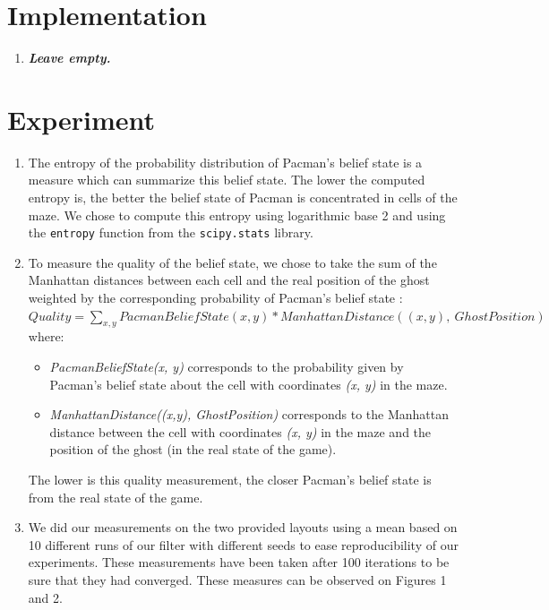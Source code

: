 \documentclass{article}
\begin{document}
\section{Implementation}

\begin{enumerate}[label=\alph*.,leftmargin=*]
    \item \textbf{\textit{Leave empty.}}
\end{enumerate}

\section{Experiment}

\begin{enumerate}[label=\alph*.,leftmargin=*]
    \item The entropy of the probability distribution of Pacman's belief state is a measure which can summarize this belief state. 
    The lower the computed entropy is, the better the belief state of Pacman is concentrated in cells of the maze. We chose to compute this entropy using logarithmic base 2 and using the \texttt{entropy} function from the \texttt{scipy.stats} library.
    
    \item To measure the quality of the belief state, we chose to take the sum of the Manhattan distances between each cell and the real position of the ghost weighted by the corresponding probability of Pacman's belief state :\\
    
    $Quality = {\sum_{x, y} {PacmanBeliefState(x, y) * ManhattanDistance((x, y), \ GhostPosition)}}$\\

    where:
    \begin{itemize}
    	\item \textit{PacmanBeliefState(x, y)} corresponds to the probability given by Pacman's belief state about the cell with coordinates \textit{(x, y)} in the maze.
    	\item \textit{ManhattanDistance((x,y), GhostPosition)} corresponds to the Manhattan distance between the cell with coordinates \textit{(x, y)} in the maze and the position of the ghost (in the real state of the game).
	\end{itemize}        
     The lower is this quality measurement, the closer Pacman's belief state is from the real state of the game.
    \item We did our measurements on the two provided layouts using a mean based on 10 different runs of our filter with different seeds to ease reproducibility of our experiments. These measurements have been taken after 100 iterations to be sure that they had converged.
    These measures can be observed on Figures 1 and 2. 


\end{enumerate}
\end{document}

